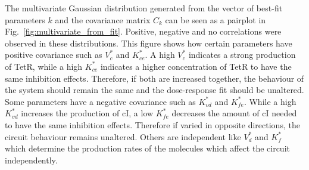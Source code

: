 The multivariate Gaussian distribution generated from the vector of best-fit parameters $k$ and the covariance matrix $C_{k}$ can be seen as a pairplot in Fig.~\ref{fig:multivariate_from_fit}.
Positive, negative and no correlations were observed in these distributions.
This figure shows how certain parameters have positive covariance such as $V^*_c$ and $K^*_{ce}$.
A high $V^*_c$ indicates a strong production of TetR, while a high $K^*_{ce}$ indicates a higher concentration of TetR to have the same inhibition effects.
Therefore, if both are increased together, the behaviour of the system should remain the same and the dose-response fit should be unaltered.
Some parameters have a negative covariance such as $K^*_{vd}$ and $K^*_{fe}$.
While a high $K^*_{vd}$ increases the production of cI, a low $K^*_{fe}$ decreases the amount of cI needed to have the same inhibition effects.
Therefore if varied in opposite directions, the circuit behaviour remains unaltered.
Others are independent like $V^*_{d}$ and $K^*_{f}$ which determine the production rates of the molecules which affect the circuit independently.


